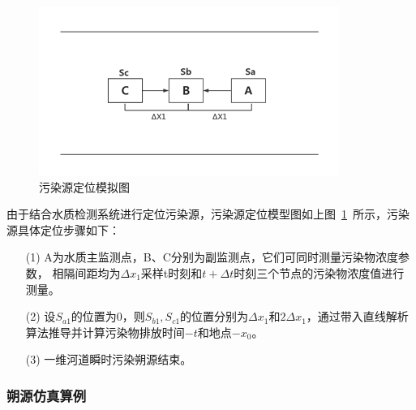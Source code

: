 \documentclass{whutmod}
\begin{document}
			\begin{figure}[H]
		\centering
		\includegraphics[width=\textwidth]{figures/wrydw.png}
		\caption{污染源定位模拟图}\label{wrydw}
	\end{figure}

由于结合水质检测系统进行定位污染源，污染源定位模型图如上图~\ref{wrydw}~所示，污染源具体定位步骤如下：
		\begin{itemize}
	\item [(1)] A为水质主监测点，B、C分别为副监测点，它们可同时测量污染物浓度参数，
	相隔间距均为$\Delta x_{1}$采样t时刻和$t+\Delta t$时刻三个节点的污染物浓度值进行测量。
	\item [(2)] 
设$S_{a1}$的位置为0，则$S_{b1},S_{c1}$的位置分别为$\Delta x_{1}$和$2\Delta x_{1}$，通过带入直线解析算法推导并计算污染物排放时间$-t$和地点$-x_{0}$。
	\item [(3)]一维河道瞬时污染朔源结束。
\end{itemize}

\subsubsection{朔源仿真算例}
\end{document}
